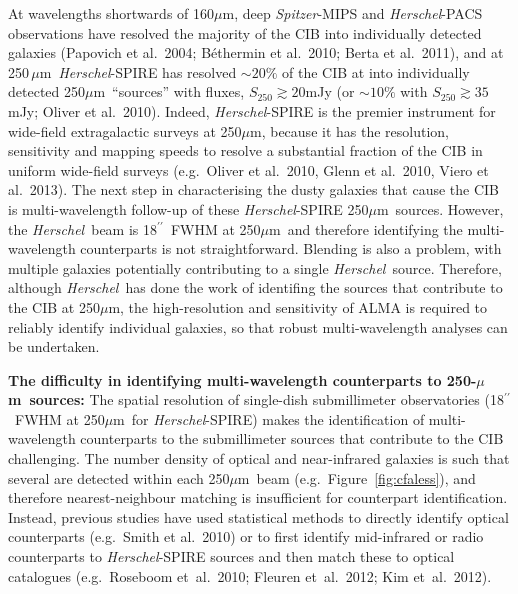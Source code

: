 \documentclass[11pt,a4paper]{article}
\newcommand{\herschel}{{\it Herschel}}
\newcommand{\spitzer}{{\it Spitzer}}
\newcommand{\ea}{et~al.}
\newcommand{\micron}{$\mu$m}
\newcommand{\arcsec}{$^{\prime\prime}$}
\begin{document}
At wavelengths shortwards of 160\micron, deep \spitzer-MIPS and
\herschel-PACS observations have resolved the majority of the CIB into
individually detected galaxies (Papovich et al.\ 2004; B\'ethermin et
al.\ 2010; Berta et al.\ 2011), and at 250\,\micron\ \herschel-SPIRE
has resolved $\sim 20\%$ of the CIB at into individually detected
250\micron\ ``sources'' with fluxes, $S_{250}\gtrsim 20$mJy (or
$\sim10\%$ with $S_{250}\gtrsim35$\,mJy; Oliver et
al.\ 2010).  Indeed, \herschel-SPIRE is the premier instrument for
wide-field extragalactic surveys at 250\micron, because it has the
resolution, sensitivity and mapping speeds to resolve a substantial
fraction of the CIB in
uniform wide-field surveys (e.g.\ Oliver et al.\ 2010, Glenn et al.\
2010, Viero et al.\ 2013).
%
The next step in characterising the dusty galaxies that cause the CIB
is multi-wavelength follow-up of these \herschel-SPIRE 250\micron\
sources.  However, the \herschel\ beam is 18\arcsec\ FWHM at
250\micron\ and therefore identifying the multi-wavelength
counterparts is not straightforward. Blending is also a problem, with
multiple galaxies potentially contributing to a single \herschel\
source. Therefore, although \herschel\ has done the work of identifing
the sources that contribute to the CIB at 250\micron, the
high-resolution and sensitivity of ALMA is required to reliably identify individual
galaxies, so that robust multi-wavelength analyses can be undertaken.



\vspace{0.3cm}
{\bf The difficulty in identifying multi-wavelength counterparts to
  250-\micron\ sources:}
%
The spatial resolution of single-dish submillimeter observatories 
(18\arcsec\ FWHM at 250\micron\ for \herschel-SPIRE) makes the
identification of multi-wavelength counterparts to the submillimeter
sources that  contribute to the CIB challenging. The number density of
optical and near-infrared galaxies is such that several are detected
within each 250\micron\ beam (e.g.\ Figure~\ref{fig:cfaless}), and therefore nearest-neighbour
matching is insufficient for counterpart identification. Instead,
previous studies have used statistical methods to directly identify
optical counterparts (e.g.\ Smith et al.\ 2010) or to first identify
mid-infrared or radio counterparts to \herschel-SPIRE sources and then match
these to optical catalogues (e.g.\ Roseboom \ea\ 2010; Fleuren \ea\
2012; Kim \ea\ 2012).
\end{document}
